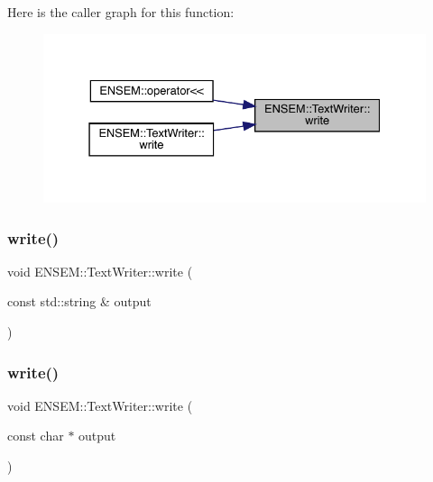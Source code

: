 Here is the caller graph for this function\+:\nopagebreak
\begin{figure}[H]
\begin{center}
\leavevmode
\includegraphics[width=331pt]{db/d53/classENSEM_1_1TextWriter_a46f85ca8047ad9b0419c1f8e40847b52_icgraph}
\end{center}
\end{figure}
\mbox{\label{classENSEM_1_1TextWriter_a46f85ca8047ad9b0419c1f8e40847b52}} 
\subsubsection{\texorpdfstring{write()}{write()}\hspace{0.1cm}{\footnotesize\ttfamily [2/24]}}
{\footnotesize\ttfamily void E\+N\+S\+E\+M\+::\+Text\+Writer\+::write (\begin{DoxyParamCaption}\item[{const std\+::string \&}]{output }\end{DoxyParamCaption})}

\mbox{\label{classENSEM_1_1TextWriter_ae8a8946f8f52884017f52cd69f809ba2}} 
\subsubsection{\texorpdfstring{write()}{write()}\hspace{0.1cm}{\footnotesize\ttfamily [3/24]}}
{\footnotesize\ttfamily void E\+N\+S\+E\+M\+::\+Text\+Writer\+::write (\begin{DoxyParamCaption}\item[{const char $\ast$}]{output }\end{DoxyParamCaption})}

